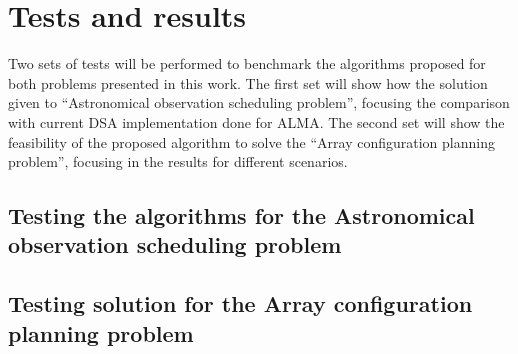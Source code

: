 \chapter{Tests and results}

Two sets of tests will be performed to benchmark the algorithms proposed for both problems presented in this work.
The first set will show how the solution given to ``Astronomical observation scheduling problem'', focusing the comparison with current DSA implementation done for ALMA.
The second set will show the feasibility of the proposed algorithm to solve the ``Array configuration planning problem'', focusing in the results for different scenarios.

\section{Testing the algorithms for the Astronomical observation scheduling problem}

\section{Testing solution for the Array configuration planning problem} 